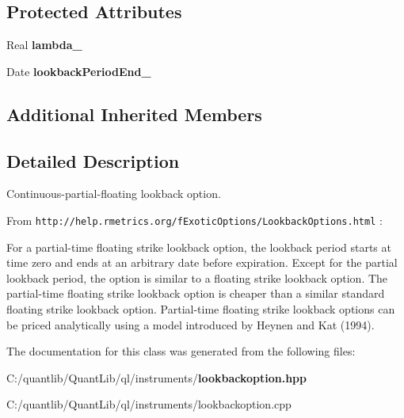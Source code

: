 \subsection*{Protected Attributes}
\begin{DoxyCompactItemize}
\item 
Real {\bfseries lambda\+\_\+}\label{class_quant_lib_1_1_continuous_partial_floating_lookback_option_a4462b4097db2bd46ff53b2d407c3a452}

\item 
Date {\bfseries lookback\+Period\+End\+\_\+}\label{class_quant_lib_1_1_continuous_partial_floating_lookback_option_a13b20e9b7c630429d19de5f572c7f1a1}

\end{DoxyCompactItemize}
\subsection*{Additional Inherited Members}


\subsection{Detailed Description}
Continuous-\/partial-\/floating lookback option. 

From {\tt http\+://help.\+rmetrics.\+org/f\+Exotic\+Options/\+Lookback\+Options.\+html} \+:

For a partial-\/time floating strike lookback option, the lookback period starts at time zero and ends at an arbitrary date before expiration. Except for the partial lookback period, the option is similar to a floating strike lookback option. The partial-\/time floating strike lookback option is cheaper than a similar standard floating strike lookback option. Partial-\/time floating strike lookback options can be priced analytically using a model introduced by Heynen and Kat (1994). 

The documentation for this class was generated from the following files\+:\begin{DoxyCompactItemize}
\item 
C\+:/quantlib/\+Quant\+Lib/ql/instruments/{\bf lookbackoption.\+hpp}\item 
C\+:/quantlib/\+Quant\+Lib/ql/instruments/lookbackoption.\+cpp\end{DoxyCompactItemize}
